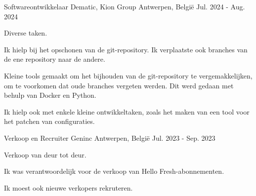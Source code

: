 

\begin{cventries}

    \cventry
      {Softwareontwikkelaar} %
      {Dematic, Kion Group} %
      {Antwerpen, België} %
      {Jul. 2024 - Aug. 2024} %
      {
        \begin{cvitems} %
          \item {Diverse taken.}
          \item {Ik hielp bij het opschonen van de git-repository. Ik verplaatste ook branches van de ene repository naar de andere.}
          \item {Kleine tools gemaakt om het bijhouden van de git-repository te vergemakkelijken, om te voorkomen dat oude branches vergeten werden. Dit werd gedaan met behulp van Docker en Python.}
          \item {Ik hielp ook met enkele kleine ontwikkeltaken, zoals het maken van een tool voor het patchen van configuraties.}
        \end{cvitems}
      }
  
    \cventry
      {Verkoop en Recruiter} %
      {Geninc} %
      {Antwerpen, België} %
      {Jul. 2023 - Sep. 2023} %
      {
        \begin{cvitems} %
          \item {Verkoop van deur tot deur.}
          \item {Ik was verantwoordelijk voor de verkoop van Hello Fresh-abonnementen.}
          \item {Ik moest ook nieuwe verkopers rekruteren.}
        \end{cvitems}
      }
  
  \end{cventries}
  
